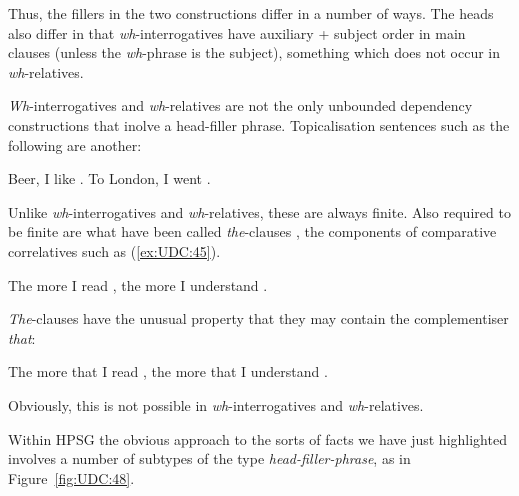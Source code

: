 \documentclass[output=paper
	        ,collection
	        ,collectionchapter
 	        ,biblatex
                ,babelshorthands
                ,newtxmath
                ,draftmode
                ,colorlinks, citecolor=brown
]{langscibook}
\begin{document}
{\noindent
Thus, the fillers in the two constructions differ in a number of ways.
The heads also differ in that \emph{wh}-interrogatives have auxiliary +
subject order in main clauses (unless the \emph{wh}-phrase is the
subject), something which does not occur in \emph{wh}-relatives.

\emph{Wh}-interrogatives and \emph{wh}-relatives are not the only
unbounded dependency constructions that inolve a head-filler phrase.
Topicalisation sentences such as the following are another:

\begin{exe} \ex \begin{xlist} \label{ex:UDC:44}
\ex Beer, I like \trace{}.
\ex To London, I went \trace{}.
\end{xlist}
\end{exe}

\noindent
Unlike \emph{wh}-interrogatives and \emph{wh}-relatives, these are
always finite. Also required to be finite are what have been called
\emph{the}-clauses \citep{Borsley:04,Sag:10a,Borsley:11}, the components of
comparative correlatives such as (\ref{ex:UDC:45}).

\begin{exe}
\ex \label{ex:UDC:45}
The more I read \trace{}, the more I understand \trace{}.
\end{exe}

\noindent
\emph{The}-clauses have the unusual property that they may contain
the complementiser \emph{that}:

\begin{exe}
\ex \label{ex:UDC:46}
The more that I read \trace{}, the more that I understand \trace{}.
\end{exe}

\noindent
Obviously, this is not possible in \emph{wh}-interrogatives and
\emph{wh}-relatives.

\begin{exe} \ex \begin{xlist} \label{ex:UDC:47}

\end{xlist}
\end{exe}

\noindent
Within HPSG the obvious approach to the sorts of facts we have just
highlighted involves a number of subtypes of the type
\emph{head-filler-phrase}, as in Figure~\ref{fig:UDC:48}.


\begin{figure}[htb]
  \centering


\end{figure}}
\end{document}
